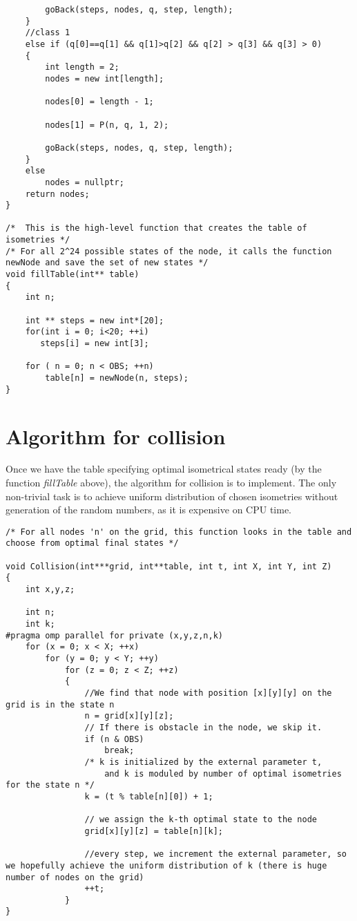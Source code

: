 \begin{lstlisting}
		goBack(steps, nodes, q, step, length);
	}
	//class 1
	else if (q[0]==q[1] && q[1]>q[2] && q[2] > q[3] && q[3] > 0)
	{
		int length = 2;
		nodes = new int[length];

		nodes[0] = length - 1;

		nodes[1] = P(n, q, 1, 2);

		goBack(steps, nodes, q, step, length);
	}
	else
		nodes = nullptr;
	return nodes;
}

/*  This is the high-level function that creates the table of isometries */
/* For all 2^24 possible states of the node, it calls the function newNode and save the set of new states */
void fillTable(int** table)
{
	int n;
	
	int ** steps = new int*[20];
	for(int i = 0; i<20; ++i)
	   steps[i] = new int[3];	

	for ( n = 0; n < OBS; ++n)
		table[n] = newNode(n, steps);
}
\end{lstlisting}

\section{Algorithm for collision}
Once we have the table specifying optimal isometrical states ready (by the function \textit{fillTable} above),
the algorithm for collision is to implement. The only non-trivial task is to achieve uniform distribution of chosen isometries without generation of the random numbers, as it is expensive on CPU time.

\begin{lstlisting}
/* For all nodes 'n' on the grid, this function looks in the table and choose from optimal final states */

void Collision(int***grid, int**table, int t, int X, int Y, int Z)
{
	int x,y,z;

	int n;
	int k;
#pragma omp parallel for private (x,y,z,n,k)
	for (x = 0; x < X; ++x)
		for (y = 0; y < Y; ++y)
			for (z = 0; z < Z; ++z)
			{
				//We find that node with position [x][y][y] on the grid is in the state n 
				n = grid[x][y][z];
				// If there is obstacle in the node, we skip it.
				if (n & OBS)
					break;
				/* k is initialized by the external parameter t,
				    and k is moduled by number of optimal isometries for the state n */
				k = (t % table[n][0]) + 1;
				
				// we assign the k-th optimal state to the node 
				grid[x][y][z] = table[n][k];
				
				//every step, we increment the external parameter, so we hopefully achieve the uniform distribution of k (there is huge number of nodes on the grid)
				++t;
			}
}
\end{lstlisting}

